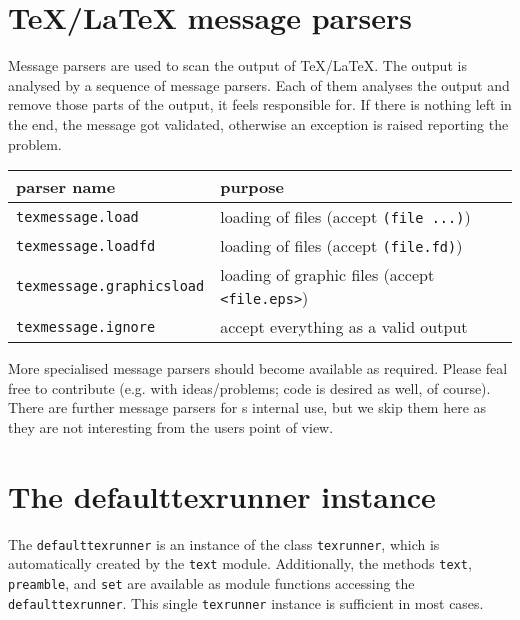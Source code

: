 \section{\TeX/\LaTeX{} message parsers}

Message parsers are used to scan the output of \TeX/\LaTeX. The output
is analysed by a sequence of message parsers. Each of them analyses
the output and remove those parts of the output, it feels responsible
for. If there is nothing left in the end, the message got validated,
otherwise an exception is raised reporting the problem.

\medskip
\begin{tabular}{ll}
parser name&purpose\\
\hline
\texttt{texmessage.load}&loading of files (accept \texttt{(file ...)})\\
\texttt{texmessage.loadfd}&loading of files (accept \texttt{(file.fd)})\\
\texttt{texmessage.graphicsload}&loading of graphic files (accept \texttt{<file.eps>})\\
\texttt{texmessage.ignore}&accept everything as a valid output\\
\end{tabular}
\medskip

More specialised message parsers should become available as required.
Please feal free to contribute (e.g. with ideas/problems; code is
desired as well, of course). There are further message parsers for
\PyX{}s internal use, but we skip them here as they are not
interesting from the users point of view.

\section{The defaulttexrunner instance}
The \verb|defaulttexrunner| is an instance of the class
\verb|texrunner|, which is automatically created by the \verb|text|
module. Additionally, the methods \verb|text|, \verb|preamble|, and
\verb|set| are available as module functions accessing the
\verb|defaulttexrunner|. This single \verb|texrunner| instance is
sufficient in most cases.

